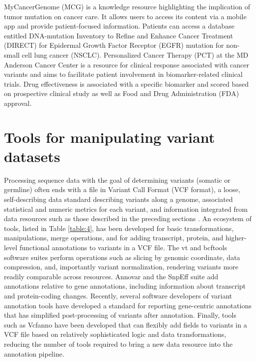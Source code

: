 \documentclass{article}
\begin{document}
MyCancerGenome (MCG) is a knowledge resource highlighting the
implication of tumor mutation on cancer care. It allows users to
access its content via a mobile app and provide patient-focused
information. Patients can access a database entitled DNA-mutation
Inventory to Refine and Enhance Cancer Treatment (DIRECT) for
Epidermal Growth Factor Receptor (EGFR) mutation for non-small cell
lung cancer (NSCLC). Personalized Cancer Therapy (PCT) at the MD
Anderson Cancer Center is a resource for clinical response associated
with cancer variants and aims to facilitate patient involvement in
biomarker-related clinical trials. Drug effectiveness is associated
with a specific biomarker and scored based on prospective clinical
study as well as Food and Drug Administration (FDA) approval.

\section{Tools for manipulating variant datasets}

 

Processing sequence data with the goal of determining variants
(somatic or germline) often ends with a file in Variant Call Format
(VCF format), a loose, self-describing data standard describing
variants along a genome, associated statistical and numeric metrics
for each variant, and information integrated from data resources such
as those described in the preceding sections \parencite{Danecek2011-du}. An
ecosystem of tools, listed in Table \ref{table:4}, has been developed for basic
transformations, manipulations, merge operations, and for adding
transcript, protein, and higher-level functional annotations to
variants in a VCF file. The vt and bcftools software suites perform
operations such as slicing by genomic coordinate, data compression,
and, importantly variant normalization, rendering variants more
readily comparable across resources. Annovar
\parencite{Yang2015-bg,Wang2010-bt} and the SnpEff suite
\parencite{Cingolani2012-pt} add annotations relative to gene annotations,
including information about transcript and protein-coding
changes. Recently, several software developers of variant annotation
tools have developed a standard for reporting gene-centric annotations
that has simplified post-processing of variants after
annotation. Finally, tools such as Vcfanno \parencite{Pedersen2016-pu} have
been developed that can flexibly add fields to variants in a VCF file
based on relatively sophisticated logic and data transformations,
reducing the number of tools required to bring a new data resource
into the annotation pipeline.
\end{document}
